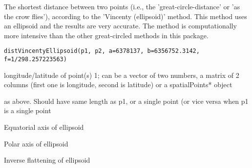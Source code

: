 \begin{Description}\relax
The shortest distance between two points (i.e., the 'great-circle-distance' or 'as the crow flies'), according to the 'Vincenty (ellipsoid)' method. 
This method uses an ellipsoid and the results are very accurate. The method is computationally more intensive than the other great-circled methods in this package.
\end{Description}
\begin{Usage}
\begin{verbatim}
distVincentyEllipsoid(p1, p2, a=6378137, b=6356752.3142, f=1/298.257223563)
\end{verbatim}
\end{Usage}
\begin{Arguments}
\begin{ldescription}
\item[\code{p1}] longitude/latitude of point(s) 1; can be a vector of two numbers, a matrix of 2 columns (first one is longitude, second is latitude) or a spatialPoints* object
\item[\code{p2}] as above. Should have same length as p1, or a single point (or vice versa when p1 is a single point
\item[\code{a}] Equatorial axis of ellipsoid
\item[\code{b}] Polar axis of ellipsoid
\item[\code{f}] Inverse flattening of ellipsoid
\end{ldescription}
\end{Arguments}

